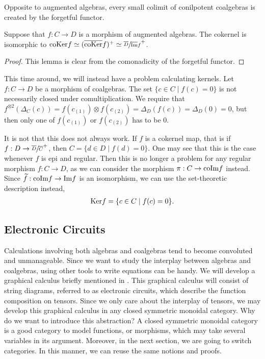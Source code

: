 \documentclass[../thesis.tex]{subfiles}
\begin{document}
                Opposite to augmented algebras, every small colimit of conilpotent coalgebras is created by the forgetful functor.

                \begin{lemma}
                    Suppose that $f: C \rightarrow D$ is a morphism of augmented algebras. The cokernel is isomorphic to $\tt{coKer}f \simeq (\overline{\tt{coKer}}f)^+ \simeq \sfrac{\overline{D}}{\overline{\tt{Im}}f}^+$.
                \end{lemma}

                \begin{proof}
                    This lemma is clear from the comonadicity of the forgetful functor.
                \end{proof}

                This time around, we will instead have a problem calculating kernels. Let $f: C \rightarrow D$ be a morphism of coalgebras. The set $\{c\in C \mid f(c) = 0\}$ is not necessarily closed under comultiplication. We require that $f^{\otimes 2}(\Delta_C(c)) = f(c_{(1)})\otimes f(c_{(2)}) = \Delta_D(f(c)) = \Delta_D(0) = 0$, but then only one of $f(c_{(1)})$ or $f(c_{(2)})$ has to be $0$.

                It is not that this does not always work. If $f$ is a cokernel map, that is if $f : D \rightarrow \sfrac{\overline{D}}{\overline{C}}^+$, then $C = \{d\in D \mid f(d) = 0\}$. One may see that this is the case whenever $f$ is epi and regular. Then this is no longer a problem for any regular morphism $f: C \rightarrow D$, as we can consider the morphism $\pi: C \rightarrow \tt{coIm}f$ instead. Since $\widetilde{f}: \tt{coIm}f \rightarrow \tt{Im}f$ is an isomorphism, we can use the set-theoretic description instead,
                \begin{align*}
                    \tt{Ker}f = \{c\in C \mid f(c) = 0\}\tt{.}
                \end{align*}

    \subsection{Electronic Circuits}
            Calculations involving both algebras and coalgebras tend to become convoluted and unmanageable. Since we want to study the interplay between algebras and coalgebras, using other tools to write equations can be handy. We will develop a graphical calculus briefly mentioned in \cite{Loday12}. This graphical calculus will consist of string diagrams, referred to as electronic circuits, which describe the function composition on tensors. Since we only care about the interplay of tensors, we may develop this graphical calculus in any closed symmetric monoidal category. Why do we want to introduce this abstraction? A closed symmetric monoidal category is a good category to model functions, or morphisms, which may take several variables in its argument. Moreover, in the next section, we are going to switch categories. In this manner, we can reuse the same notions and proofs.
            
\end{document}
